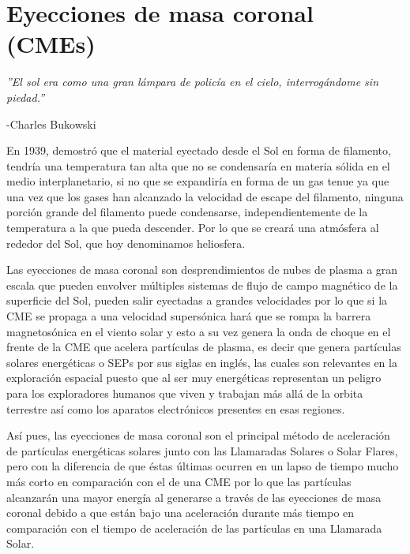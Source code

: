 \chapter{Eyecciones de masa coronal (CMEs)}

\begin{flushright}
\textit{''El sol era como una gran lámpara de policía en el cielo, interrogándome sin piedad.''}

-Charles Bukowski
\end{flushright}


En 1939, \cite{lyman-1939} demostró que el material eyectado desde el Sol en forma de filamento, tendría una temperatura tan alta que no se condensaría en materia sólida en el medio interplanetario, si no que se expandiría en forma de un gas tenue ya que una vez que los gases han alcanzado la velocidad de escape del filamento, ninguna porción grande del filamento puede condensarse, independientemente de la temperatura a la que pueda descender. Por lo que se creará una atmósfera al rededor del Sol, que hoy denominamos heliosfera.

Las eyecciones de masa coronal son desprendimientos de nubes de plasma a gran escala que pueden envolver múltiples sistemas de flujo de campo magnético de la superficie del Sol, pueden salir eyectadas a grandes velocidades por lo que si la \ac{CME} se propaga a una velocidad supersónica hará que se rompa la barrera magnetosónica en el viento solar y esto a su vez genera la onda de choque en el frente de la \ac{CME} que acelera partículas de plasma, es decir que genera partículas solares energéticas o SEPs por sus siglas en inglés, las cuales son relevantes en la exploración espacial puesto que al ser muy energéticas representan un peligro para los exploradores humanos que viven y trabajan más allá de la orbita terrestre así como los aparatos electrónicos presentes en esas regiones.

Así pues, las eyecciones de masa coronal son el principal método de aceleración de partículas energéticas solares junto con las Llamaradas Solares o Solar Flares, pero con la diferencia de que éstas últimas ocurren en un lapso de tiempo mucho más corto en comparación con el de una \ac{CME} por lo que las partículas alcanzarán una mayor energía al generarse a través de las eyecciones de masa coronal debido a que están bajo una aceleración durante más tiempo en comparación con el tiempo de aceleración de las partículas en una Llamarada Solar.


